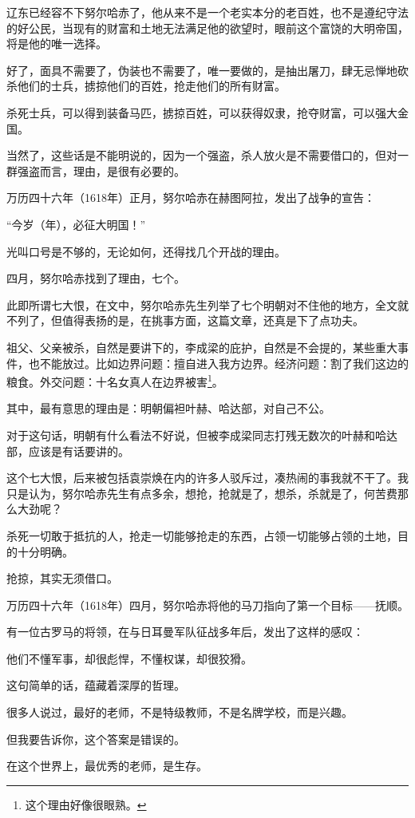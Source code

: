 \begin{multicols}{\theparacolNo}
辽东已经容不下努尔哈赤了，他从来不是一个老实本分的老百姓，也不是遵纪守法的好公民，当现有的财富和土地无法满足他的欲望时，眼前这个富饶的大明帝国，将是他的唯一选择。

好了，面具不需要了，伪装也不需要了，唯一要做的，是抽出屠刀，肆无忌惮地砍杀他们的士兵，掳掠他们的百姓，抢走他们的所有财富。

杀死士兵，可以得到装备马匹，掳掠百姓，可以获得奴隶，抢夺财富，可以强大金国。

当然了，这些话是不能明说的，因为一个强盗，杀人放火是不需要借口的，但对一群强盗而言，理由，是很有必要的。

万历四十六年（1618年）正月，努尔哈赤在赫图阿拉，发出了战争的宣告：

“今岁（年），必征大明国！”

光叫口号是不够的，无论如何，还得找几个开战的理由。

四月，努尔哈赤找到了理由，七个。

此即所谓七大恨，在文中，努尔哈赤先生列举了七个明朝对不住他的地方，全文就不列了，但值得表扬的是，在挑事方面，这篇文章，还真是下了点功夫。

祖父、父亲被杀，自然是要讲下的，李成梁的庇护，自然是不会提的，某些重大事件，也不能放过。比如边界问题：擅自进入我方边界。经济问题：割了我们这边的粮食。外交问题：十名女真人在边界被害\footnote{这个理由好像很眼熟。}。

其中，最有意思的理由是：明朝偏袒叶赫、哈达部，对自己不公。

对于这句话，明朝有什么看法不好说，但被李成梁同志打残无数次的叶赫和哈达部，应该是有话要讲的。

这个七大恨，后来被包括袁崇焕在内的许多人驳斥过，凑热闹的事我就不干了。我只是认为，努尔哈赤先生有点多余，想抢，抢就是了，想杀，杀就是了，何苦费那么大劲呢？

杀死一切敢于抵抗的人，抢走一切能够抢走的东西，占领一切能够占领的土地，目的十分明确。

抢掠，其实无须借口。

万历四十六年（1618年）四月，努尔哈赤将他的马刀指向了第一个目标——抚顺。

有一位古罗马的将领，在与日耳曼军队征战多年后，发出了这样的感叹：

他们不懂军事，却很彪悍，不懂权谋，却很狡猾。

这句简单的话，蕴藏着深厚的哲理。

很多人说过，最好的老师，不是特级教师，不是名牌学校，而是兴趣。

但我要告诉你，这个答案是错误的。

在这个世界上，最优秀的老师，是生存。


\end{multicols}
